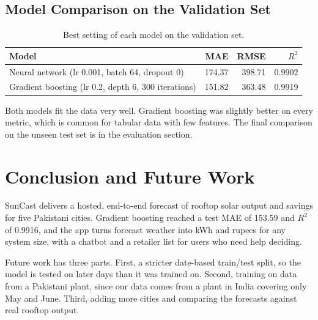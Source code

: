 \documentclass[11pt,a4paper]{article}
\begin{document}
\subsection{Model Comparison on the Validation Set}
\begin{table}[H]
\centering
\caption{Best setting of each model on the validation set.}
\begin{tabular}{lrrr}
\toprule
Model & MAE & RMSE & $R^2$ \\
\midrule
Neural network (lr 0.001, batch 64, dropout 0) & 174.37 & 398.71 & 0.9902 \\
Gradient boosting (lr 0.2, depth 6, 300 iterations) & 151.82 & 363.48 & 0.9919 \\
\bottomrule
\end{tabular}
\end{table}
Both models fit the data very well. Gradient boosting was slightly better on
every metric, which is common for tabular data with few features. The final
comparison on the unseen test set is in the evaluation section.












\section{Conclusion and Future Work}
SunCast delivers a hosted, end-to-end forecast of rooftop solar output and
savings for five Pakistani cities. Gradient boosting reached a test MAE of
153.59 and $R^2$ of 0.9916, and the app turns forecast weather into kWh and
rupees for any system size, with a chatbot and a retailer list for users who
need help deciding.

Future work has three parts. First, a stricter date-based train/test split,
so the model is tested on later days than it was trained on. Second,
training on data from a Pakistani plant, since our data comes from a plant in
India covering only May and June. Third, adding more cities and comparing the
forecasts against real rooftop output.



\end{document}
